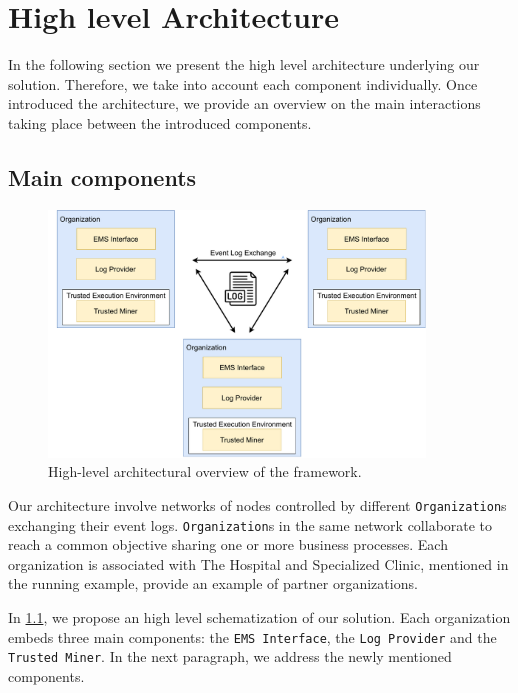 \section{High level Architecture}
In the following section we present the high level architecture underlying our solution. Therefore, we take into account each component individually. Once introduced the architecture, we provide an overview on the main interactions taking place between the introduced components.
\subsection{Main components}
\label{fig:architecture_diagram}
\begin{figure}[t]
\centering
\includegraphics[width=10cm]{content/figures/architecture_diagram.pdf}
\caption{High-level architectural overview of the framework.}
\label{fig:implementation}
\end{figure}
Our architecture involve networks of nodes controlled by different \texttt{Organization}s exchanging their event logs. \texttt{Organization}s in the same network collaborate to reach a common objective sharing one or more business processes. Each organization is associated with  The Hospital and Specialized Clinic, mentioned in the running example, provide an example of partner organizations.

In \cref{fig:architecture_diagram}, we propose an high level schematization of our solution. Each organization embeds three main components: the \texttt{EMS Interface}, the \texttt{Log Provider} and the \texttt{Trusted Miner}. %
In the next paragraph, we address the newly mentioned components.
